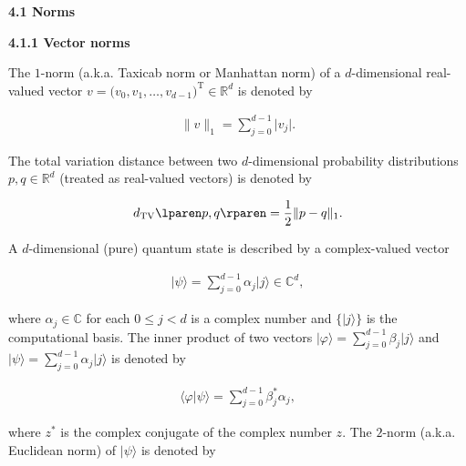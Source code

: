 \documentclass[10pt,a4paper]{article}
\begin{document}
\par\medskip\noindent\textbf{
4.1 Norms}\par




\par\medskip\noindent\textbf{
4.1.1 Vector norms}\par




The $1$-norm (a.k.a. Taxicab norm or Manhattan norm) of a $d$-dimensional real-valued vector $v=\lparen v_{0},v_{1},\dots,v_{d-1}\rparen^{\mathrm{T}}\in\mathbb{R}^{d}$ is denoted by\par


\[\begin{gathered}
\lVert v\rVert_{1}=\sum_{j=0}^{d-1}\lvert v_{j}\rvert.
\end{gathered}\]


The total variation distance between two $d$-dimensional probability distributions $p,q\in\mathbb{R}^{d}$ (treated as real-valued vectors) is denoted by\par


\[\begin{gathered}
d_{\textup{TV}}\lparen p,q\rparen=\frac{1}{2}\lVert p-q\rVert_{1}.
\end{gathered}\]




A $d$-dimensional (pure) quantum state is described by a complex-valued vector\par


\[\begin{gathered}
\lvert\psi\rangle=\sum_{j=0}^{d-1}\alpha_{j}\lvert j\rangle\in\mathbb{C}^{d},
\end{gathered}\]


where $\alpha_{j}\in\mathbb{C}$ for each $0\leq j<d$ is a complex number and $\{\lvert j\rangle\}$ is the computational basis.
The inner product of two vectors $\lvert\varphi\rangle=\sum_{j=0}^{d-1}\beta_{j}\lvert j\rangle$ and $\lvert\psi\rangle=\sum_{j=0}^{d-1}\alpha_{j}\lvert j\rangle$ is denoted by\par


\[\begin{gathered}
\langle\varphi|\psi\rangle=\sum_{j=0}^{d-1}\beta_{j}^{*}\alpha_{j},
\end{gathered}\]


where $z^{*}$ is the complex conjugate of the complex number $z$.
The $2$-norm (a.k.a. Euclidean norm) of $\lvert\psi\rangle$ is denoted by\par
\end{document}
